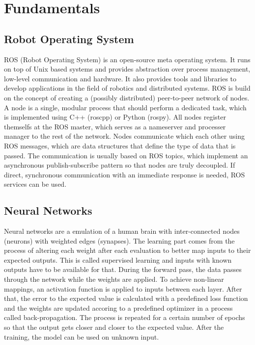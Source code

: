 \chapter{Fundamentals}

\section{Robot Operating System}
ROS (Robot Operating System) is an open-source meta operating system. It runs on top of Unix based systems and 
provides abstraction over process management, low-level communication and hardware. It also provides tools and 
libraries to develop applications in the field of robotics and distributed systems. ROS is build on the concept 
of creating a (possibly distributed) peer-to-peer network of nodes. A node is a single, modular process that 
should perform a dedicated task, which is implemented using C++ (roscpp) or Python (rospy). All nodes register 
themselfs at the ROS master, which serves as a nameserver and processer manager to the rest of the network. 
Nodes communicate which each other using ROS messages, which are data structures that define 
the type of data that is passed. The communication is usually based on ROS topics, 
which implement an asynchronous publish-subscribe pattern so that nodes are truly decoupled. 
If direct, synchronous communication with an immediate response is needed, ROS services can be used.

\section{Neural Networks}
Neural networks are a emulation of a human brain with inter-connected nodes (neurons) with weighted edges (synapses). 
The learning part comes from the process of altering each weight after each evaluation to better map inputs to their 
expected outputs. This is called supervised learning and inputs with known outputs have to be available for that.
During the forward pass, the data passes through the network while the weights are applied. To achieve non-linear mappings, 
an activation function is applied to inputs between each layer. After that, the error to the expected value is 
calculated with a predefined loss function and the weights are updated accoring to a predefined optimizer in a process 
called back-propagation. The process is repeated for a certain number of epochs so that the output gets closer and closer 
to the expected value. After the training, the model can be used on unknown input.

